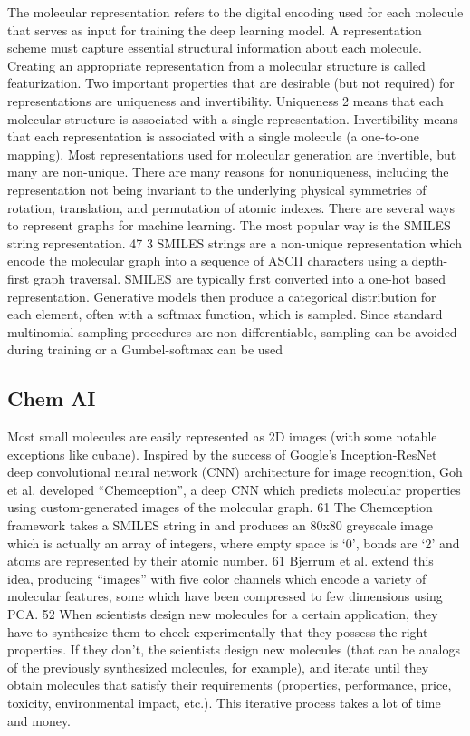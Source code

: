 The molecular representation refers to the digital encoding used
for each molecule that serves as input for training the deep learning model. A representation scheme must capture essential structural information about each molecule. Creating an appropriate
representation from a molecular structure is called featurization.
Two important properties that are desirable (but not required)
for representations are uniqueness and invertibility. Uniqueness
2
means that each molecular structure is associated with a single representation. Invertibility means that each representation
is associated with a single molecule (a one-to-one mapping).
Most representations used for molecular generation are invertible, but many are non-unique. There are many reasons for nonuniqueness, including the representation not being invariant to
the underlying physical symmetries of rotation, translation, and
permutation of atomic indexes.
There are several ways to represent graphs for machine learning. The most popular way is the SMILES string representation. 47
3
SMILES strings are a non-unique representation which encode
the molecular graph into a sequence of ASCII characters using
a depth-first graph traversal. SMILES are typically first converted
into a one-hot based representation. Generative models then produce a categorical distribution for each element, often with a softmax function, which is sampled. Since standard multinomial sampling procedures are non-differentiable, sampling can be avoided
during training or a Gumbel-softmax can be used
\subsection{Chem AI}
Most small molecules are easily represented as 2D images (with
some notable exceptions like cubane). Inspired by the success
of Google’s Inception-ResNet deep convolutional neural network
(CNN) architecture for image recognition, Goh et al. developed
“Chemception”, a deep CNN which predicts molecular properties
using custom-generated images of the molecular graph. 61 The
Chemception framework takes a SMILES string in and produces
an 80x80 greyscale image which is actually an array of integers,
where empty space is ‘0’, bonds are ‘2’ and atoms are represented
by their atomic number. 61 Bjerrum et al. extend this idea, producing “images” with five color channels which encode a variety
of molecular features, some which have been compressed to few
dimensions using PCA. 52
When scientists design new molecules for a certain application, they have to synthesize them to check experimentally that they possess the right properties. If they don't, the scientists design new molecules (that can be analogs of the previously synthesized molecules, for example), and iterate until they obtain molecules that satisfy their requirements (properties, performance, price, toxicity, environmental impact, etc.). This iterative process takes a lot of time and money.


